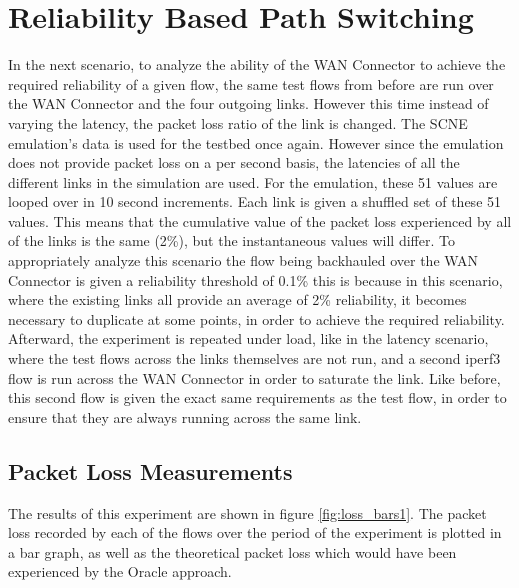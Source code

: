 \section{Reliability Based Path Switching}

In the next scenario, to analyze the ability of the WAN Connector to achieve the required reliability of a given flow, the same test flows from before are run over the WAN Connector and the four outgoing links. However this time instead of varying the latency, the packet loss ratio of the link is changed. The SCNE emulation's data is used for the testbed once again. However since the emulation does not provide packet loss on a per second basis, the latencies of all the different links in the simulation are used. For the emulation, these 51 values are looped over in 10 second increments. Each link is given a shuffled set of these 51 values. This means that the cumulative value of the packet loss experienced by all of the links is the same (2\%), but the instantaneous values will differ. To appropriately analyze this scenario the flow being backhauled over the WAN Connector is given a reliability threshold of 0.1\% this is because in this scenario, where the existing links all provide an average of 2\% reliability, it becomes necessary to duplicate at some points, in order to achieve the required reliability. Afterward, the experiment is repeated under load, like in the latency scenario, where the test flows across the links themselves are not run, and a second iperf3 flow is run across the WAN Connector in order to saturate the link. Like before, this second flow is given the exact same requirements as the test flow, in order to ensure that they are always running across the same link.

\subsection{Packet Loss Measurements}

 The results of this experiment are shown in figure \ref{fig:loss_bars1}. The packet loss recorded by each of the flows over the period of the experiment is plotted in a bar graph, as well as the theoretical packet loss which would have been experienced by the Oracle approach.

